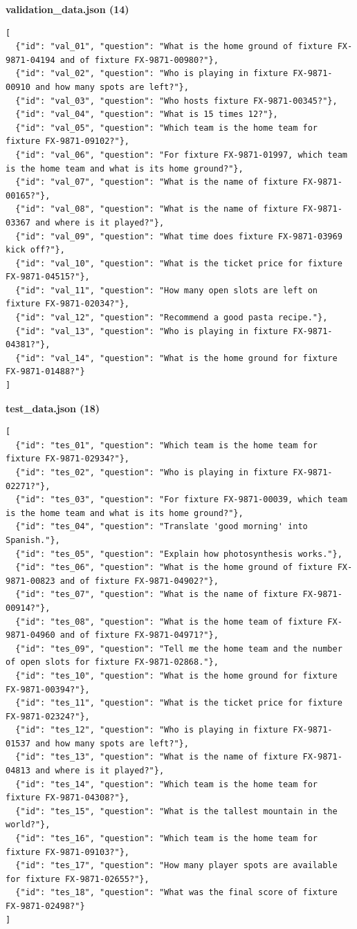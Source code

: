 \documentclass[11pt]{article}
\begin{document}
\endgroup
\textbf{validation\_data.json (14)}
\begingroup\lstset{basicstyle=\ttfamily\tiny}
\begin{lstlisting}
[
  {"id": "val_01", "question": "What is the home ground of fixture FX-9871-04194 and of fixture FX-9871-00980?"},
  {"id": "val_02", "question": "Who is playing in fixture FX-9871-00910 and how many spots are left?"},
  {"id": "val_03", "question": "Who hosts fixture FX-9871-00345?"},
  {"id": "val_04", "question": "What is 15 times 12?"},
  {"id": "val_05", "question": "Which team is the home team for fixture FX-9871-09102?"},
  {"id": "val_06", "question": "For fixture FX-9871-01997, which team is the home team and what is its home ground?"},
  {"id": "val_07", "question": "What is the name of fixture FX-9871-00165?"},
  {"id": "val_08", "question": "What is the name of fixture FX-9871-03367 and where is it played?"},
  {"id": "val_09", "question": "What time does fixture FX-9871-03969 kick off?"},
  {"id": "val_10", "question": "What is the ticket price for fixture FX-9871-04515?"},
  {"id": "val_11", "question": "How many open slots are left on fixture FX-9871-02034?"},
  {"id": "val_12", "question": "Recommend a good pasta recipe."},
  {"id": "val_13", "question": "Who is playing in fixture FX-9871-04381?"},
  {"id": "val_14", "question": "What is the home ground for fixture FX-9871-01488?"}
]
\end{lstlisting}
\endgroup
\textbf{test\_data.json (18)}
\begingroup\lstset{basicstyle=\ttfamily\tiny}
\begin{lstlisting}
[
  {"id": "tes_01", "question": "Which team is the home team for fixture FX-9871-02934?"},
  {"id": "tes_02", "question": "Who is playing in fixture FX-9871-02271?"},
  {"id": "tes_03", "question": "For fixture FX-9871-00039, which team is the home team and what is its home ground?"},
  {"id": "tes_04", "question": "Translate 'good morning' into Spanish."},
  {"id": "tes_05", "question": "Explain how photosynthesis works."},
  {"id": "tes_06", "question": "What is the home ground of fixture FX-9871-00823 and of fixture FX-9871-04902?"},
  {"id": "tes_07", "question": "What is the name of fixture FX-9871-00914?"},
  {"id": "tes_08", "question": "What is the home team of fixture FX-9871-04960 and of fixture FX-9871-04971?"},
  {"id": "tes_09", "question": "Tell me the home team and the number of open slots for fixture FX-9871-02868."},
  {"id": "tes_10", "question": "What is the home ground for fixture FX-9871-00394?"},
  {"id": "tes_11", "question": "What is the ticket price for fixture FX-9871-02324?"},
  {"id": "tes_12", "question": "Who is playing in fixture FX-9871-01537 and how many spots are left?"},
  {"id": "tes_13", "question": "What is the name of fixture FX-9871-04813 and where is it played?"},
  {"id": "tes_14", "question": "Which team is the home team for fixture FX-9871-04308?"},
  {"id": "tes_15", "question": "What is the tallest mountain in the world?"},
  {"id": "tes_16", "question": "Which team is the home team for fixture FX-9871-09103?"},
  {"id": "tes_17", "question": "How many player spots are available for fixture FX-9871-02655?"},
  {"id": "tes_18", "question": "What was the final score of fixture FX-9871-02498?"}
]
\end{lstlisting}
\endgroup
\end{document}
